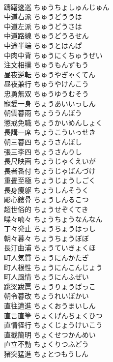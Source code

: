 \documentclass[8pt]{extreport}
\begin{document}
\begin{CJK}{UTF8}{min}
\\	躊躇逡巡	ちゅうちょしゅんじゅん	
\\	中道右派	ちゅうどううは	
\\	中道左派	ちゅうどうさは	
\\	中道路線	ちゅうどうろせん	
\\	中途半端	ちゅうとはんぱ	
\\	中肉中背	ちゅうにくちゅうぜい	
\\	注文相撲	ちゅうもんずもう	
\\	昼夜逆転	ちゅうやぎゃくてん	
\\	昼夜兼行	ちゅうやけんこう	
\\	忠勇無双	ちゅうゆうむそう	
\\	寵愛一身	ちょうあいいっしん	
\\	朝雲暮雨	ちょううんぼう	
\\	懲戒免職	ちょうかいめんしょく	
\\	長講一席	ちょうこういっせき	
\\	朝三暮四	ちょうさんぼし	
\\	張三李四	ちょうさんりし	
\\	長尺映画	ちょうじゃくえいが	
\\	長者番付	ちょうじゃばんづけ	
\\	重畳至極	ちょうじょうしごく	
\\	長身痩躯	ちょうしんそうく	
\\	彫心鏤骨	ちょうしんるこつ	
\\	超世俗的	ちょうせぞくてき	
\\	喋々喃々	ちょうちょうなんなん	
\\	丁々発止	ちょうちょうはっし	
\\	朝々暮々	ちょうちょうぼぼ	
\\	長汀曲浦	ちょうていきょくほ	
\\	町人気質	ちょうにんかたぎ	
\\	町人根性	ちょうにんこんじょう	
\\	町人風情	ちょうにんふぜい	
\\	跳梁跋扈	ちょうりょうばっこ	
\\	朝令暮改	ちょうれいぼかい	
\\	直往邁進	ちょくおうまいしん	
\\	直言直筆	ちょくげんちょくひつ	
\\	直情径行	ちょくじょうけいこう	
\\	直截簡明	ちょくせつかんめい	
\\	直立不動	ちょくりつふどう	
\\	猪突猛進	ちょとつもうしん	

\end{CJK}
\end{document}
